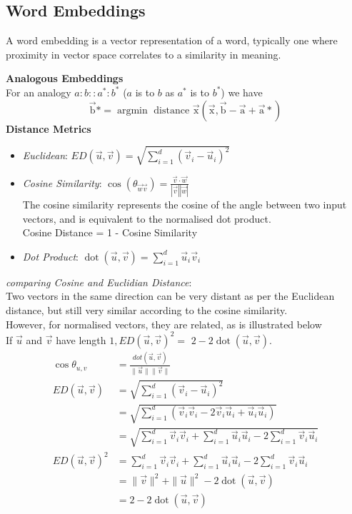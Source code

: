 \documentclass[8pt]{extarticle} %
\begin{document}
\begin{multicols*}{3}
\subsection*{Word Embeddings}

A word embedding is a vector representation of a word, typically one where proximity in vector space correlates to a similarity in meaning.

\textbf{Analogous Embeddings}\\
For an analogy $a:b:: a^*: b^*$ ($a$ is to $b$ as $a^*$ is to $b^*$) we have 
$$
\overrightarrow{\mathrm{b}} *=\operatorname{argmin} \text { distance } \overrightarrow{\mathrm{x}}(\overrightarrow{\mathrm{x}}, \overrightarrow{\mathrm{b}}-\overrightarrow{\mathrm{a}}+\overrightarrow{\mathrm{a}} *)
$$
\textbf{Distance Metrics}
\begin{itemize}[label=\textbullet, labelsep=0.3em, leftmargin=0.5em, itemsep=0em]
    \item \textit{Euclidean}: $E D(\vec{u}, \vec{v})=\sqrt{\sum_{i=1}^d\left(\vec{v}_i-\vec{u}_i\right)^2}$
    \item \textit{Cosine Similarity}: $\cos \left(\theta_{\vec{w} \vec{v}}\right)=\frac{\vec{v} \cdot \vec{w}}{|\vec{v}||\vec{w}|}$\\
The cosine similarity represents the cosine of the angle between two input vectors, and is equivalent to the normalised dot product. \\
Cosine Distance = 1 - Cosine Similarity
    \item \textit{Dot Product}: $\operatorname{dot}(\vec{u}, \vec{v})=\sum_{i=1}^d \vec{u}_i \vec{v}_i$
\end{itemize}
\textit{comparing Cosine and Euclidian Distance}:\\
Two vectors in the same direction can be very distant as per the Euclidean distance, but still very similar according to the cosine similarity. \\
However, for normalised vectors, they are related, as is illustrated below\\
If $\vec{u}$ and $\vec{v}$ have length $1, E D(\vec{u}, \vec{v})^2=$ $2-2 \operatorname{dot}(\vec{u}, \vec{v})$.
$$
\begin{aligned}
\cos \theta_{u, v} & =\frac{d o t(\vec{u}, \vec{v})}{\|\vec{u}\|\|\vec{v}\|} \\
E D(\vec{u}, \vec{v}) & =\sqrt{\sum_{i=1}^d\left(\vec{v}_i-\vec{u}_i\right)^2} \\
&=\sqrt{\sum_{i=1}^d\left(\vec{v}_i \vec{v}_i-2 \vec{v}_i \vec{u}_i+\vec{u}_i \vec{u}_i\right)}\\
&=\sqrt{\sum_{i=1}^d \vec{v}_i \vec{v}_i+\sum_{i=1}^d \vec{u}_i \vec{u}_i-2 \sum_{i=1}^d \vec{v}_i \vec{u}_i} \\
E D(\vec{u}, \vec{v})^2 & =\sum_{i=1}^d \vec{v}_i \vec{v}_i+\sum_{i=1}^d \vec{u}_i \vec{u}_i-2 \sum_{i=1}^d \vec{v}_i \vec{u}_i\\
&=\|\vec{v}\|^2+\|\vec{u}\|^2-2 \operatorname{dot}(\vec{u}, \vec{v})\\
&=2-2\operatorname{dot}(\vec{u}, \vec{v})
\end{aligned}
$$


\end{multicols*}
\end{document}
